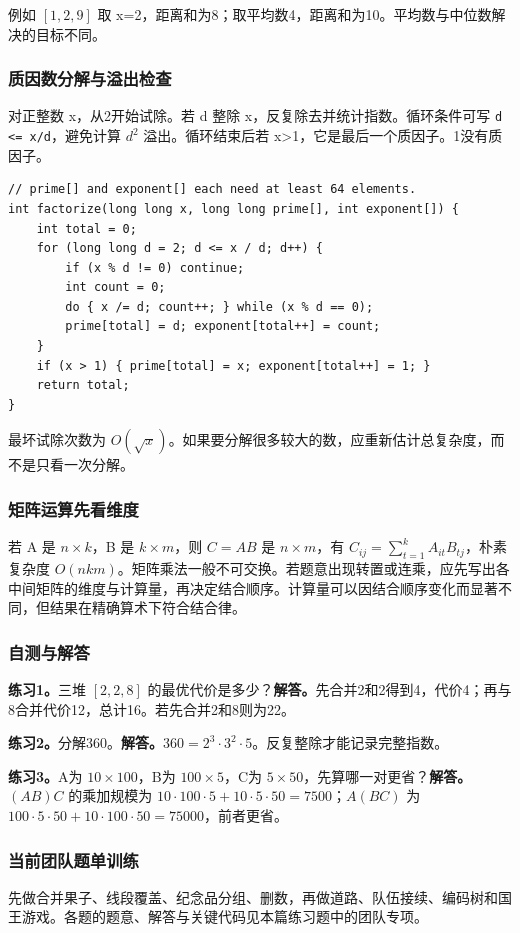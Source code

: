 例如 $[1,2,9]$ 取 x=2，距离和为8；取平均数4，距离和为10。平均数与中位数解决的目标不同。

\subsubsection{质因数分解与溢出检查}
对正整数 x，从2开始试除。若 d 整除 x，反复除去并统计指数。循环条件可写 \texttt{d <= x/d}，避免计算 $d^2$ 溢出。循环结束后若 x>1，它是最后一个质因子。1没有质因子。
\begin{lstlisting}
// prime[] and exponent[] each need at least 64 elements.
int factorize(long long x, long long prime[], int exponent[]) {
    int total = 0;
    for (long long d = 2; d <= x / d; d++) {
        if (x % d != 0) continue;
        int count = 0;
        do { x /= d; count++; } while (x % d == 0);
        prime[total] = d; exponent[total++] = count;
    }
    if (x > 1) { prime[total] = x; exponent[total++] = 1; }
    return total;
}
\end{lstlisting}
最坏试除次数为 $O(\sqrt{x})$。如果要分解很多较大的数，应重新估计总复杂度，而不是只看一次分解。

\subsubsection{矩阵运算先看维度}
若 A 是 $n\times k$，B 是 $k\times m$，则 $C=AB$ 是 $n\times m$，有 $C_{ij}=\sum_{t=1}^k A_{it}B_{tj}$，朴素复杂度 $O(nkm)$。矩阵乘法一般不可交换。若题意出现转置或连乘，应先写出各中间矩阵的维度与计算量，再决定结合顺序。计算量可以因结合顺序变化而显著不同，但结果在精确算术下符合结合律。

\subsubsection{自测与解答}
\textbf{练习1。}三堆 $[2,2,8]$ 的最优代价是多少？\textbf{解答。}先合并2和2得到4，代价4；再与8合并代价12，总计16。若先合并2和8则为22。

\textbf{练习2。}分解360。\textbf{解答。}$360=2^3\cdot3^2\cdot5$。反复整除才能记录完整指数。

\textbf{练习3。}A为 $10\times100$，B为 $100\times5$，C为 $5\times50$，先算哪一对更省？\textbf{解答。}$(AB)C$ 的乘加规模为 $10\cdot100\cdot5+10\cdot5\cdot50=7500$；$A(BC)$ 为 $100\cdot5\cdot50+10\cdot100\cdot50=75000$，前者更省。
\newpage

\subsubsection{当前团队题单训练}
先做合并果子、线段覆盖、纪念品分组、删数，再做道路、队伍接续、编码树和国王游戏。各题的题意、解答与关键代码见本篇练习题中的团队专项。
